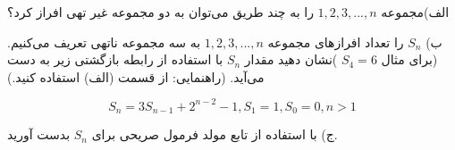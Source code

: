 \EXERCISE
الف)مجموعه
${1, 2, 3, ..., n}$
را به چند طریق می‌توان به دو مجموعه غیر تهی افراز کرد؟

ب)
$S_n$
را تعداد افرازهای مجموعه
${1, 2, 3, ..., n}$
به سه مجموعه ناتهی تعریف می‌کنیم.(برای مثال
$S_4 = 6$
)نشان دهید مقدار
$S_n$
با استفاده از رابطه بازگشتی زیر به دست می‌آید.
(راهنمایی: از قسمت (الف) استفاده کنید.)

$$S_n = 3S_{n-1} + 2^{n-2} - 1, S_1 = 1, S_0 = 0, n > 1$$

ج) با استفاده از تابع مولد فرمول صریحی برای
$S_n$
بدست آورید.